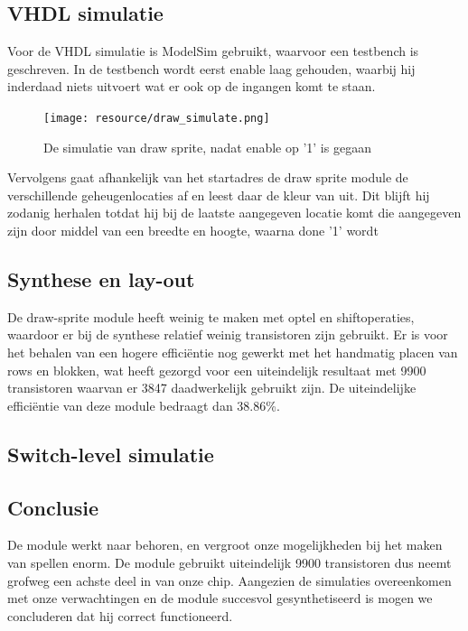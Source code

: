 \documentclass{scrartcl} %
\begin{document}
\subsection{VHDL simulatie}
Voor de VHDL simulatie is ModelSim gebruikt, waarvoor een testbench is geschreven. In de testbench wordt eerst enable laag gehouden, waarbij hij inderdaad niets uitvoert wat er ook op de ingangen komt te staan.\\
\begin{figure}[H]
	\centering
	\texttt{[image: resource/draw\_simulate.png]}
	\caption{De simulatie van draw sprite, nadat enable op '1' is gegaan}
	\label{fig:draw-sprite-simulatie}
\end{figure}
Vervolgens gaat afhankelijk van het startadres de draw sprite module de verschillende geheugenlocaties af en leest daar de kleur van uit. Dit blijft hij zodanig herhalen totdat hij bij de laatste aangegeven locatie komt die aangegeven zijn door middel van een breedte en hoogte, waarna done '1' wordt

\subsection{Synthese en lay-out}
De draw-sprite module heeft weinig te maken met optel en shiftoperaties, waardoor er bij de synthese relatief weinig transistoren zijn gebruikt. Er is voor het behalen van een hogere efficiëntie nog gewerkt met het handmatig placen van rows en blokken, wat heeft gezorgd voor een uiteindelijk resultaat met 9900 transistoren waarvan er 3847 daadwerkelijk gebruikt zijn. De uiteindelijke efficiëntie van deze module bedraagt dan 38.86\%.

\subsection{Switch-level simulatie}


\subsection{Conclusie}
De module werkt naar behoren, en vergroot onze mogelijkheden bij het maken van spellen enorm. De module gebruikt uiteindelijk 9900 transistoren dus neemt grofweg een achste deel in van onze chip. Aangezien de simulaties overeenkomen met onze verwachtingen en de module succesvol gesynthetiseerd is mogen we concluderen dat hij correct functioneerd.
\end{document}
